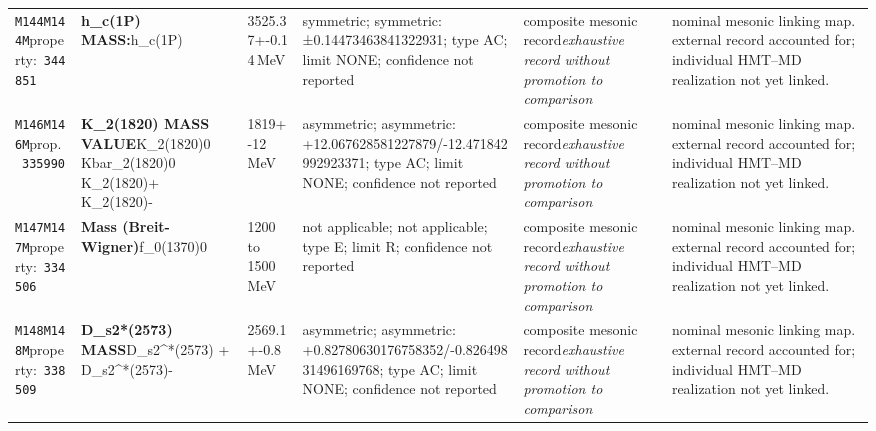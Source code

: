 \begin{landscape}
\begin{longtable}{L{1.85cm}L{4.45cm}L{2.35cm}L{4.05cm}L{3.35cm}L{7.15cm}}
\texttt{M144}\newline \texttt{M144M}\newline property:\ \texttt{344851} & \textbf{h\_\allowbreak{}c(1P) MASS:}\newline h\_\allowbreak{}c(1P) & 3525.37+-0.14\,MeV & symmetric; symmetric: ±0.14473463841322931; type AC; limit NONE; confidence not reported & composite mesonic record\newline \emph{exhaustive record without promotion to comparison} & nominal mesonic linking map. external record accounted for; individual HMT--MD realization not yet linked. \\
\texttt{M146}\newline \texttt{M146M}\newline prop.\ \texttt{335990} & \textbf{K\_\allowbreak{}2(1820) MASS VALUE}\newline K\_\allowbreak{}2(1820)0 \textbar{}\allowbreak{} Kbar\_\allowbreak{}2(1820)0 \textbar{}\allowbreak{} K\_\allowbreak{}2(1820)+ \textbar{}\allowbreak{} K\_\allowbreak{}2(1820)- & 1819+-12\,MeV & asymmetric; asymmetric: +12.067628581227879/-12.471842992923371; type AC; limit NONE; confidence not reported & composite mesonic record\newline \emph{exhaustive record without promotion to comparison} & nominal mesonic linking map. external record accounted for; individual HMT--MD realization not yet linked. \\
\texttt{M147}\newline \texttt{M147M}\newline property:\ \texttt{334506} & \textbf{Mass (Breit-Wigner)}\newline f\_\allowbreak{}0(1370)0 & 1200 to 1500\,MeV & not applicable; not applicable; type E; limit R; confidence not reported & composite mesonic record\newline \emph{exhaustive record without promotion to comparison} & nominal mesonic linking map. external record accounted for; individual HMT--MD realization not yet linked. \\
\texttt{M148}\newline \texttt{M148M}\newline property:\ \texttt{338509} & \textbf{D\_\allowbreak{}s2*(2573) MASS}\newline D\_\allowbreak{}s2\textasciicircum{}*(2573) + \textbar{}\allowbreak{} D\_\allowbreak{}s2\textasciicircum{}*(2573)- & 2569.1+-0.8\,MeV & asymmetric; asymmetric: +0.82780630176758352/-0.82649831496169768; type AC; limit NONE; confidence not reported & composite mesonic record\newline \emph{exhaustive record without promotion to comparison} & nominal mesonic linking map. external record accounted for; individual HMT--MD realization not yet linked. \\

\end{longtable}
\end{landscape}
